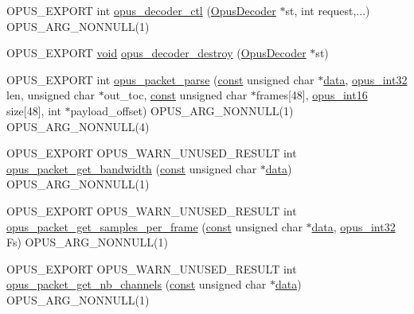 \begin{DoxyCompactItemize}
\item 
O\+P\+U\+S\+\_\+\+E\+X\+P\+O\+RT int \hyperlink{group__opus__decoder_gae70051dd19b78e25241bb6ca9a222f12}{opus\+\_\+decoder\+\_\+ctl} (\hyperlink{group__opus__decoder_ga401d8579958d36094715a6b90cd159a6}{Opus\+Decoder} $\ast$st, int request,...) O\+P\+U\+S\+\_\+\+A\+R\+G\+\_\+\+N\+O\+N\+N\+U\+LL(1)
\item 
O\+P\+U\+S\+\_\+\+E\+X\+P\+O\+RT \hyperlink{png_8h_ac9c84fa68bbad002983e35ce3663c686}{void} \hyperlink{group__opus__decoder_gae8cba5f0f579a37e09b5fdc6267bf8ed}{opus\+\_\+decoder\+\_\+destroy} (\hyperlink{group__opus__decoder_ga401d8579958d36094715a6b90cd159a6}{Opus\+Decoder} $\ast$st)
\item 
O\+P\+U\+S\+\_\+\+E\+X\+P\+O\+RT int \hyperlink{group__opus__decoder_gaa48fa0479919163df306d13a6aa58546}{opus\+\_\+packet\+\_\+parse} (\hyperlink{zconf_8h_a2c212835823e3c54a8ab6d95c652660e}{const} unsigned char $\ast$\hyperlink{jpeglib_8h_aa379dc8ae39e55ae0c431a61a7d2f2bc}{data}, \hyperlink{opus__types_8h_aa4d309d6f80b99dbabebc8f98879ab9a}{opus\+\_\+int32} len, unsigned char $\ast$out\+\_\+toc, \hyperlink{zconf_8h_a2c212835823e3c54a8ab6d95c652660e}{const} unsigned char $\ast$frames\mbox{[}48\mbox{]}, \hyperlink{opus__types_8h_acc9ed7cf60479eb81f9648c6ec27dc26}{opus\+\_\+int16} size\mbox{[}48\mbox{]}, int $\ast$payload\+\_\+offset) O\+P\+U\+S\+\_\+\+A\+R\+G\+\_\+\+N\+O\+N\+N\+U\+LL(1) O\+P\+U\+S\+\_\+\+A\+R\+G\+\_\+\+N\+O\+N\+N\+U\+LL(4)
\item 
O\+P\+U\+S\+\_\+\+E\+X\+P\+O\+RT O\+P\+U\+S\+\_\+\+W\+A\+R\+N\+\_\+\+U\+N\+U\+S\+E\+D\+\_\+\+R\+E\+S\+U\+LT int \hyperlink{group__opus__decoder_ga01a86c22c369f60a458443b397b710d8}{opus\+\_\+packet\+\_\+get\+\_\+bandwidth} (\hyperlink{zconf_8h_a2c212835823e3c54a8ab6d95c652660e}{const} unsigned char $\ast$\hyperlink{jpeglib_8h_aa379dc8ae39e55ae0c431a61a7d2f2bc}{data}) O\+P\+U\+S\+\_\+\+A\+R\+G\+\_\+\+N\+O\+N\+N\+U\+LL(1)
\item 
O\+P\+U\+S\+\_\+\+E\+X\+P\+O\+RT O\+P\+U\+S\+\_\+\+W\+A\+R\+N\+\_\+\+U\+N\+U\+S\+E\+D\+\_\+\+R\+E\+S\+U\+LT int \hyperlink{group__opus__decoder_ga885564fa670e308100dfda89d3cdea10}{opus\+\_\+packet\+\_\+get\+\_\+samples\+\_\+per\+\_\+frame} (\hyperlink{zconf_8h_a2c212835823e3c54a8ab6d95c652660e}{const} unsigned char $\ast$\hyperlink{jpeglib_8h_aa379dc8ae39e55ae0c431a61a7d2f2bc}{data}, \hyperlink{opus__types_8h_aa4d309d6f80b99dbabebc8f98879ab9a}{opus\+\_\+int32} Fs) O\+P\+U\+S\+\_\+\+A\+R\+G\+\_\+\+N\+O\+N\+N\+U\+LL(1)
\item 
O\+P\+U\+S\+\_\+\+E\+X\+P\+O\+RT O\+P\+U\+S\+\_\+\+W\+A\+R\+N\+\_\+\+U\+N\+U\+S\+E\+D\+\_\+\+R\+E\+S\+U\+LT int \hyperlink{group__opus__decoder_gae272ae9645edae1a6da1d1337709fa3b}{opus\+\_\+packet\+\_\+get\+\_\+nb\+\_\+channels} (\hyperlink{zconf_8h_a2c212835823e3c54a8ab6d95c652660e}{const} unsigned char $\ast$\hyperlink{jpeglib_8h_aa379dc8ae39e55ae0c431a61a7d2f2bc}{data}) O\+P\+U\+S\+\_\+\+A\+R\+G\+\_\+\+N\+O\+N\+N\+U\+LL(1)

\end{DoxyCompactItemize}
